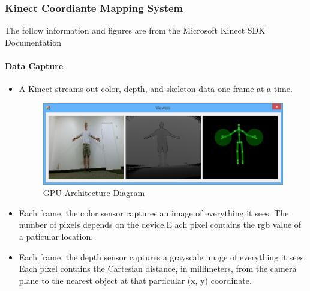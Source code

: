 \documentclass[a4paper,10pt]{article}
\begin{document}
\subsubsection{Kinect Coordiante Mapping System}
The follow information and figures are from the Microsoft Kinect SDK Documentation \cite{msdnKinect}
\paragraph{Data Capture}
\begin{itemize}
\item A Kinect streams out color, depth, and skeleton data one frame at a time. 
\begin{figure}[H]
	\includegraphics[width=\linewidth,height=\paperheight,keepaspectratio]{kinectCoord.png}
	\caption{GPU Architecture Diagram}
	\label{fig:kinectCoord}
	\end{figure}

\item Each frame, the color sensor captures an image of everything it sees. The number of pixels depends on the device.E ach pixel contains the rgb value of a paticular location.

\item Each frame, the depth sensor captures a grayscale image of everything it sees. Each pixel contains the Cartesian distance, in millimeters, from the camera plane to the nearest 
object at that particular (x, y) coordinate.


\end{itemize}
\end{document}
